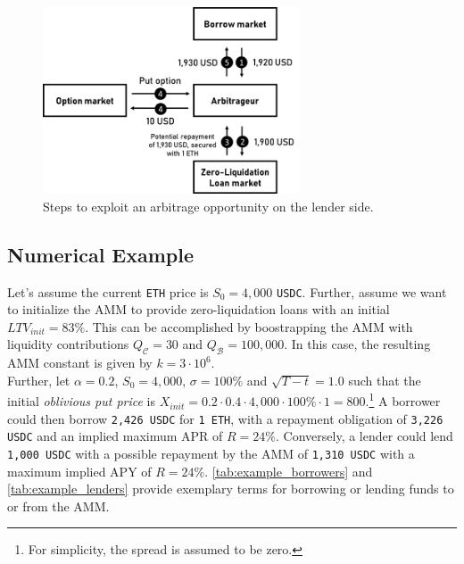 \documentclass[a4paper]{article}
\begin{document}
\begin{figure}
    \centering
    \includegraphics[width=0.68\textwidth]{figures/lend_arbitrage_use_case.png}
    \cprotect\caption{\small Steps to exploit an arbitrage opportunity on the lender side.}
    \label{fig:lend_arbitrage_use_case}
\end{figure}

\subsection{Numerical Example}
Let's assume the current \verb|ETH| price is $S_0=4,000$ \verb|USDC|. Further, assume we want to initialize the AMM to provide zero-liquidation loans with an initial $LTV_{init}=83\%$. This can be accomplished by boostrapping the AMM with liquidity contributions $Q_\mathcal{C}=30$ and $Q_\mathcal{B}=100,000$. In this case, the resulting AMM constant is given by $k=3\cdot10^6$.\\

Further, let $\alpha=0.2$, $S_0=4,000$, $\sigma=100\%$ and $\sqrt{T-t}=1.0$ such that the initial \emph{oblivious put price} is $X_{init} = 0.2 \cdot 0.4 \cdot 4,000 \cdot 100\% \cdot 1 = 800$.\footnote{For simplicity, the spread is assumed to be zero.} A borrower could then borrow \verb|2,426 USDC| for \verb|1 ETH|, with a repayment obligation of \verb|3,226 USDC| and an implied maximum APR of $R=24\%$. Conversely, a lender could lend \verb|1,000 USDC| with a possible repayment by the AMM of \verb|1,310 USDC| with a maximum implied APY of $R=24\%$. \cref{tab:example_borrowers} and \cref{tab:example_lenders} provide exemplary terms for borrowing or lending funds to or from the AMM.
\end{document}
